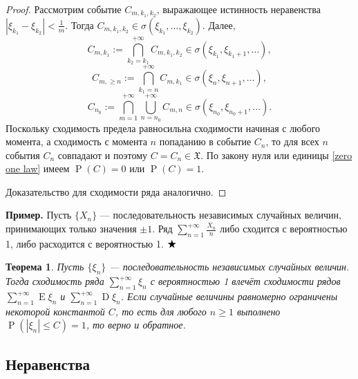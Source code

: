\documentclass[12pt]{article}
\newtheorem{theorem}{Теорема}
\numberwithin{theorem}{section}
\theoremstyle{definition}
\newenvironment{example}{\indent \textbf{Пример.}}{$ \hfill \bigstar $}
\newcommand{\prob}{\operatorname{P}}
\newcommand{\expect}{\operatorname{E}}
\newcommand{\disp}{\operatorname{D}}
\begin{document}
	\begin{proof}
		Рассмотрим событие $ C_{m, k_1, k_2} $, выражающее истинность неравенства 
		$ \left|\xi_{k_1} - \xi_{k_2}\right| < \tfrac{1}{m} $.
		Тогда $ C_{m, k_1, k_2} \in \sigma(\xi_{k_1}, \ldots, \xi_{k_2}) $. 
		Далее, $$ C_{m, k_1} := \bigcap\limits_{k_2 = k_1}^{+\infty} C_{m, k_1, k_2} \in \sigma(\xi_{k_1}, \xi_{k_1 + 1},\ldots), $$
		$$ C_{m, \geqslant n} := \bigcap\limits_{k_1 = n}^{+\infty} C_{m, k_1} \in \sigma(\xi_{n}, \xi_{n + 1},\ldots), $$
		$$ C_{n_0} := \bigcap\limits_{m = 1}^{+\infty} 
		\bigcup\limits_{n = n_0}^{+\infty} C_{m, n} \in \sigma(\xi_{n_0}, \xi_{n_0 + 1},\ldots). $$
		Поскольку сходимость предела равносильна сходимости начиная с любого момента,
		а сходимость с момента $ n $ попаданию в событие $ C_{n} $,
		то для всех $ n $ события $ C_{n} $ совпадают и поэтому $ C = C_{n} \in \mathfrak{X} $.
		По закону нуля или единицы \ref{zero one law} имеем $ \prob(C) = 0 $ или $ \prob(C) = 1 $.
		
		Доказательство для сходимости ряда аналогично.
	\end{proof}
	
	\begin{example}
		Пусть $ \{X_n\} $ --- последовательность независимых случайных величин, принимающих только значения $ \pm 1 $.
		Ряд $ \sum\limits_{n = 1}^{+\infty} \tfrac{X_n}{n} $ либо сходится с вероятностью 1,
		либо расходится с вероятностью 1.
	\end{example}
	
	\begin{theorem}
		Пусть $ \{\xi_n\} $ --- последовательность независимых случайных величин.
		Тогда сходимость ряда $ \sum\limits_{n = 1}^{+\infty} \xi_n $ с вероятностью 1
		влечёт сходимости рядов $ \sum\limits_{n = 1}^{+\infty} \expect\xi_n $
		и $ \sum\limits_{n = 1}^{+\infty} \disp\xi_n $.
		Если случайные величины равномерно ограничены некоторой константой $ C $,
		то есть для любого $ n \geqslant 1 $ выполнено $ \prob(|\xi_n| \leqslant C) = 1 $,
		то верно и обратное.
	\end{theorem}
	
	\subsection{Неравенства}
	
\end{document}
